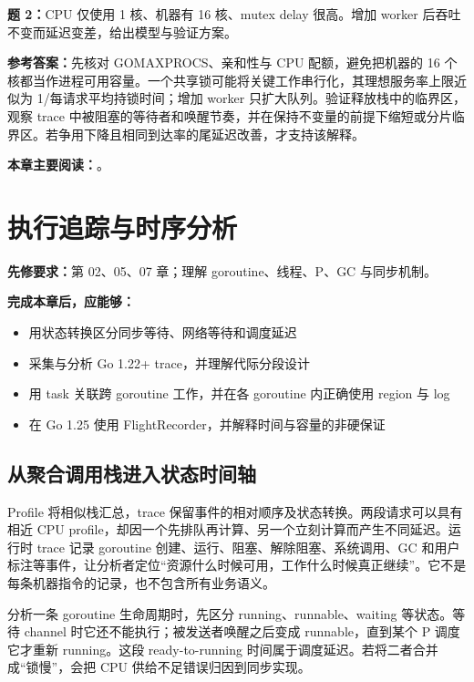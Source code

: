 \documentclass[UTF8,fontset=fandol,openany,11pt]{ctexbook}
\begin{document}
\noindent\textbf{题 2：}CPU 仅使用 1 核、机器有 16 核、mutex delay 很高。增加 worker 后吞吐不变而延迟变差，给出模型与验证方案。

\noindent\textbf{参考答案：}先核对 GOMAXPROCS、亲和性与 CPU 配额，避免把机器的 16 个核都当作进程可用容量。一个共享锁可能将关键工作串行化，其理想服务率上限近似为 1/每请求平均持锁时间；增加 worker 只扩大队列。验证释放栈中的临界区，观察 trace 中被阻塞的等待者和唤醒节奏，并在保持不变量的前提下缩短或分片临界区。若争用下降且相同到达率的尾延迟改善，才支持该解释。

\medskip\noindent\textbf{本章主要阅读：}\cite{tools-pprof}\cite{tools-mprof}\cite{tools-go122}\cite{tools-metrics}。
\chapter{执行追踪与时序分析}
\label{ch:08}
\par\medskip
\noindent\textbf{先修要求：}第 02、05、07 章；理解 goroutine、线程、P、GC 与同步机制。

\noindent\textbf{完成本章后，应能够：}
\begin{itemize}
\item 用状态转换区分同步等待、网络等待和调度延迟
\item 采集与分析 Go 1.22+ trace，并理解代际分段设计
\item 用 task 关联跨 goroutine 工作，并在各 goroutine 内正确使用 region 与 log
\item 在 Go 1.25 使用 FlightRecorder，并解释时间与容量的非硬保证
\end{itemize}
\section{从聚合调用栈进入状态时间轴}
Profile 将相似栈汇总，trace 保留事件的相对顺序及状态转换。两段请求可以具有相近 CPU profile，却因一个先排队再计算、另一个立刻计算而产生不同延迟。运行时 trace 记录 goroutine 创建、运行、阻塞、解除阻塞、系统调用、GC 和用户标注等事件，让分析者定位“资源什么时候可用，工作什么时候真正继续”。它不是每条机器指令的记录，也不包含所有业务语义。\cite{tools-trace-doc}

分析一条 goroutine 生命周期时，先区分 running、runnable、waiting 等状态。等待 channel 时它还不能执行；被发送者唤醒之后变成 runnable，直到某个 P 调度它才重新 running。这段 ready-to-running 时间属于调度延迟。若将二者合并成“锁慢”，会把 CPU 供给不足错误归因到同步实现。
\end{document}
